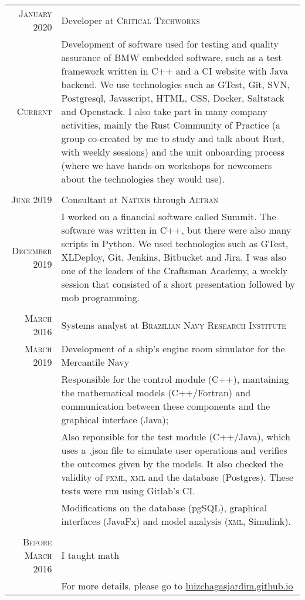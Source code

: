 \documentclass[a4paper,10pt]{article}
\begin{document}
\begin{tabular}{r|p{11cm}}

\textsc{January 2020} & Developer at \textsc{Critical Techworks}\\
\textsc{Current} & Development of software used for testing and quality assurance of BMW embedded software, such as a test framework written in C++ and a CI website with Java backend. We use technologies such as GTest, Git, SVN, Postgresql, Javascript, HTML, CSS, Docker, Saltstack and Openstack. I also take part in many company activities, mainly the Rust Community of Practice (a group co-created by me to study and talk about Rust, with weekly sessions) and the unit onboarding process (where we have hands-on workshops for newcomers about the technologies they would use).\\

\multicolumn{2}{c}{}\\


\textsc{June 2019} & Consultant at \textsc{Natixis} through \textsc{Altran}\\
\textsc{December 2019} & I worked on a financial software called Summit. The software was written in C++, but there were also many scripts in Python. We used technologies such as GTest, XLDeploy, Git, Jenkins, Bitbucket and Jira. I was also one of the leaders of the Craftsman Academy, a weekly session that consisted of a short presentation followed by mob programming.\\

\multicolumn{2}{c}{}\\

\textsc{March 2016} & Systems analyst at \textsc{Brazilian Navy Research Institute}\\
\textsc{March 2019} & Development of a ship's engine room simulator for the Mercantile Navy\\&
\footnotesize{Responsible for the control module (C++), mantaining the mathematical models (C++/Fortran) and communication between these components and the graphical interface (Java);}\\&
\footnotesize{Also reponsible for the test module (C++/Java), which uses a .json file to simulate user operations and verifies the outcomes given by the models. It also checked the validity of \textsc{fxml}, \textsc{xml} and the database (Postgres). These tests were run using Gitlab's CI.}\\&
\footnotesize{Modifications on the database (pgSQL), graphical interfaces (JavaFx) and model analysis (\textsc{xml}, Simulink).}\\

\multicolumn{2}{c}{}\\

\textsc{Before March 2016} & I taught math\\
& \footnotesize{For more details, please go to \href{http://luizchagasjardim.github.io}{luizchagasjardim.github.io}}
\end{tabular}
\end{document}
